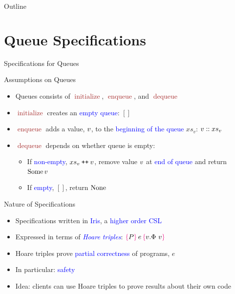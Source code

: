 \documentclass[9pt,xcolor={dvipsnames}]{beamer}
\newcommand{\initialise}{\operatorname{initialize}}
\newcommand{\enqueue}{\operatorname{enqueue}}
\newcommand{\dequeue}{\operatorname{dequeue}}
\newcommand{\absvalue}{\val}
\newcommand{\absvalueList}{xs_v}
\newcommand\catenate{\mathbin{\text{\ttfamily\upshape ++}}}
\begin{document}
\begin{frame}{Outline}
  \tableofcontents
\end{frame}


\section{Queue Specifications}

\begin{frame}{Specifications for Queues}
  \begin{block}{Assumptions on Queues}
    \begin{itemize}
      \item Queues consists of \textcolor{Brown}{$\initialise$}, \textcolor{Brown}{$\enqueue$}, and \textcolor{Brown}{$\dequeue$}
      \item \textcolor{Brown}{$\initialise$} creates an \textcolor{blue}{empty queue}: $[]$
      \item \textcolor{Brown}{$\enqueue$} adds a value, $\absvalue$, to the \textcolor{blue}{beginning of the queue} $\absvalueList$: $\absvalue :: \absvalueList$
      \item \textcolor{Brown}{$\dequeue$} depends on whether queue is empty:
        \begin{itemize}
          \item If \textcolor{blue}{non-empty}, $\absvalueList \catenate \absvalue$, remove value $\absvalue$ at \textcolor{blue}{end of queue} and return \textcolor{blue}{$\Some \absvalue$}
          \item If \textcolor{blue}{empty}, $[]$, return \textcolor{blue}{$\operatorname{None}$}
        \end{itemize}
    \end{itemize}
  \end{block}
  \begin{block}{Nature of Specifications}
    \begin{itemize}
      \item Specifications written in \textcolor{blue}{Iris}, a \textcolor{blue}{higher order CSL}
      \item Expressed in terms of \textcolor{blue}{\textit{Hoare triples}}: $\hoare{P}{e}{v. \Phi ~ v}$
      \item Hoare triples prove \textcolor{blue}{partial correctness} of programs, $e$
      \item In particular: \textcolor{blue}{safety}
      \item Idea: clients can use Hoare triples to prove results about their own code
    \end{itemize}
  \end{block}
\end{frame}
\end{document}
